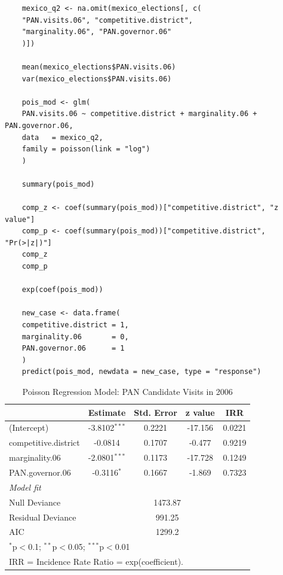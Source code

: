 \documentclass[12pt,letterpaper]{article}
\begin{document}
\tiny \begin{BVerbatim}
	mexico_q2 <- na.omit(mexico_elections[, c(
	"PAN.visits.06", "competitive.district",
	"marginality.06", "PAN.governor.06"
	)])
	
	mean(mexico_elections$PAN.visits.06)
	var(mexico_elections$PAN.visits.06)
	
	pois_mod <- glm(
	PAN.visits.06 ~ competitive.district + marginality.06 + PAN.governor.06,
	data   = mexico_q2,
	family = poisson(link = "log")
	)
	
	summary(pois_mod)
	
	comp_z <- coef(summary(pois_mod))["competitive.district", "z value"]
	comp_p <- coef(summary(pois_mod))["competitive.district", "Pr(>|z|)"]
	comp_z
	comp_p
	
	exp(coef(pois_mod))
	
	new_case <- data.frame(
	competitive.district = 1,
	marginality.06       = 0,
	PAN.governor.06      = 1
	)
	predict(pois_mod, newdata = new_case, type = "response")
\end{BVerbatim}
\normalsize \newline

\begin{table}[H]
	\centering
	\caption{Poisson Regression Model: PAN Candidate Visits in 2006}
	\label{tab:poisson}
	\begin{tabular}{lcccc}
		\hline\hline
		& Estimate        & Std. Error & z value & IRR    \\
		\hline
		(Intercept)          & -3.8102$^{***}$ & 0.2221     & -17.156 & 0.0221 \\
		competitive.district & -0.0814         & 0.1707     & -0.477  & 0.9219 \\
		marginality.06       & -2.0801$^{***}$ & 0.1173     & -17.728 & 0.1249 \\
		PAN.governor.06      & -0.3116$^{*}$   & 0.1667     & -1.869  & 0.7323 \\
		\hline
		\multicolumn{5}{l}{\textit{Model fit}} \\
		Null Deviance        & \multicolumn{4}{c}{1473.87} \\
		Residual Deviance    & \multicolumn{4}{c}{991.25}  \\
		AIC                  & \multicolumn{4}{c}{1299.2}  \\
		\hline\hline
		\multicolumn{5}{l}{\footnotesize $^{*}$p$<$0.1; $^{**}$p$<$0.05; $^{***}$p$<$0.01} \\
		\multicolumn{5}{l}{\footnotesize IRR = Incidence Rate Ratio = 
			exp(coefficient).} \\
	\end{tabular}
\end{table}
\end{document}
